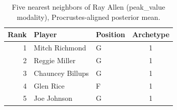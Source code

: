 \begin{table}[htbp]
  \centering\small
  \begin{tabular}{rllc}
    \toprule
    Rank & Player & Position & Archetype \\
    \midrule
    1 & Mitch Richmond & G & 1 \\
    2 & Reggie Miller & G & 1 \\
    3 & Chauncey Billups & G & 1 \\
    4 & Glen Rice & F & 1 \\
    5 & Joe Johnson & G & 1 \\
    \bottomrule
  \end{tabular}
  \caption{Five nearest neighbors of Ray Allen (peak_value modality), Procrustes-aligned posterior mean.}
  \label{tab:Ray_Allen_neighbors_peak_value}
\end{table}

